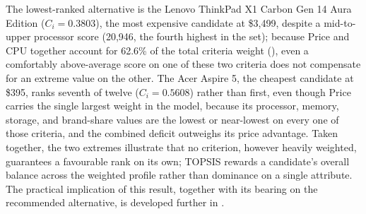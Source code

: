 The lowest-ranked alternative is the Lenovo ThinkPad X1 Carbon Gen 14 Aura Edition
($C_i = 0.3803$), the most expensive candidate at \$3{,}499, despite a mid-to-upper
processor score (20{,}946, the fourth highest in the set); because Price and CPU together
account for 62.6\% of the total criteria weight (), even a comfortably
above-average score on one of these two criteria does not compensate for an extreme value
on the other. The Acer Aspire 5, the cheapest candidate at \$395, ranks seventh of twelve
($C_i = 0.5608$) rather than first, even though Price carries the single largest weight in
the model, because its processor, memory, storage, and brand-share values are the lowest
or near-lowest on every one of those criteria, and the combined deficit outweighs its
price advantage. Taken together, the two
extremes illustrate that no criterion, however heavily weighted, guarantees a favourable
rank on its own; TOPSIS rewards a candidate's overall balance across the weighted profile
rather than dominance on a single attribute. The practical implication of this result,
together with its bearing on the recommended alternative, is developed further in
.

